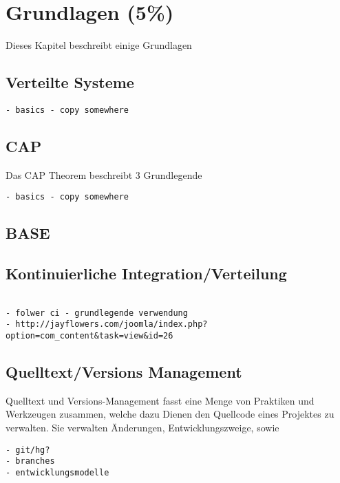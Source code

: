 \chapter{Grundlagen (5\%)}
\label{chap:base}
Dieses Kapitel beschreibt einige Grundlagen

\section{Verteilte Systeme}
\label{sec:base:vs}

\begin{verbatim}
- basics - copy somewhere
\end{verbatim}

\section{CAP}
\label{sec:base:cap}



Das CAP Theorem beschreibt 3 Grundlegende

\begin{verbatim}
- basics - copy somewhere
\end{verbatim}

\section{BASE}
\label{sec:base:base}

\section{Kontinuierliche Integration/Verteilung}
\label{sec:base:ci}
\begin{verbatim}

- folwer ci - grundlegende verwendung
- http://jayflowers.com/joomla/index.php?option=com_content&task=view&id=26
\end{verbatim}

\section{Quelltext/Versions Management}
\label{sec:base:scm}


Quelltext und Versions-Management fasst eine Menge
von Praktiken und Werkzeugen zusammen,
welche dazu Dienen den Quellcode eines Projektes zu verwalten.
Sie verwalten \"Anderungen, Entwicklungszweige, sowie 




\begin{verbatim}
- git/hg?
- branches
- entwicklungsmodelle
\end{verbatim}
